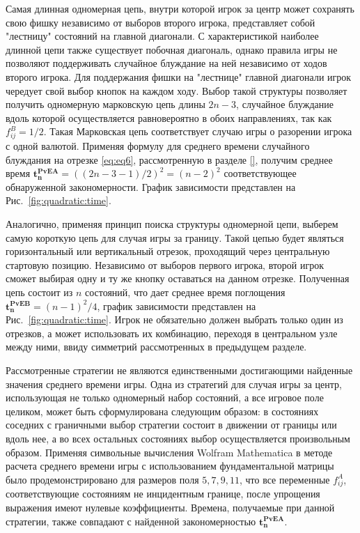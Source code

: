 Самая длинная одномерная цепь, внутри которой игрок за центр может сохранять свою фишку независимо от выборов второго игрока, 
представляет собой "лестницу" состояний на главной диагонали. С характеристикой наиболее длинной цепи также существует побочная диагональ, однако
правила игры не позволяют поддерживать случайное блуждание на ней независимо от ходов второго игрока. 
Для поддержания фишки на "лестнице" главной диагонали игрок чередует свой выбор кнопок на каждом ходу.
Выбор такой структуры позволяет получить одномерную марковскую 
цепь длины $2n-3$, случайное блуждание вдоль которой осуществляется равновероятно в обоих направлениях, так как $f_{ij}^B=1/2$.
Такая Марковская цепь соответствует случаю игры о разорении игрока с одной валютой. Применяя формулу для среднего времени случайного блуждания на отрезке \eqref{eq:eq6},
рассмотренную в разделе \cref{}, получим среднее время $\boldsymbol{t_n^{PvE A}} = ((2n-3-1)/2)^2 = (n-2)^2$ соответствующее обнаруженной закономерности.
График зависимости представлен на Рис.~\cref{fig:quadratic:time}.

Аналогично, применяя принцип поиска структуры одномерной цепи, выберем самую короткую цепь для случая игры за границу.
Такой цепью будет являться горизонтальный или вертикальный отрезок, проходящий через центральную стартовую позицию.
Независимо от выборов первого игрока, второй игрок сможет выбирая одну и ту же кнопку оставаться на данном отрезке.
Полученная цепь состоит из $n$ состояний, что дает среднее время поглощения $\boldsymbol{t_n^{PvE B}} = (n-1)^2/4$, 
график зависимости представлен на Рис.~\cref{fig:quadratic:time}.
Игрок не обязательно должен выбрать только один из отрезков, а может использовать их комбинацию, переходя в центральном узле между ними,
ввиду симметрий рассмотренных в предыдущем разделе. 

Рассмотренные стратегии не являются единственными достигающими найденные значения среднего времени игры. 
Одна из стратегий для случая игры за центр, использующая не только одномерный набор состояний, а все игровое поле целиком, 
может быть сформулирована следующим образом: в состояниях соседних с граничными выбор стратегии состоит в движении от границы или вдоль нее, 
а во всех остальных состояниях выбор осуществляется произвольным образом. Применяя символьные вычисления Wolfram Mathematica
в методе расчета среднего времени игры с использованием фундаментальной матрицы было продемонстрировано для размеров поля
$5, 7, 9, 11$, что все переменные $f_{ij}^A$, соответствующие состояниям не инцидентным границе, после упрощения выражения имеют нулевые коэффициенты.
Времена, получаемые при данной стратегии, также совпадают с найденной закономерностью $\boldsymbol{t_n^{PvE A}}$.

